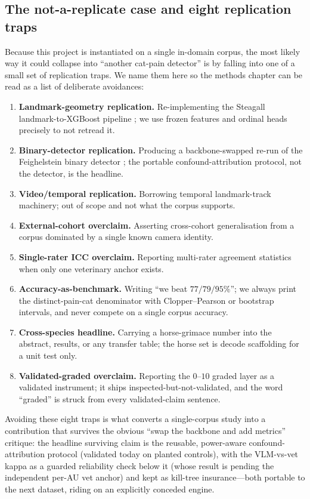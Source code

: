 \subsection{The not-a-replicate case and eight replication traps}
\label{subsec:bg-traps}

Because this project is instantiated on a single in-domain corpus, the most
likely way it could collapse into \enquote{another cat-pain detector} is by
falling into one of a small set of replication traps. We name them here so the
methods chapter can be read as a list of deliberate avoidances:

\begin{enumerate}
  \item \textbf{Landmark-geometry replication.} Re-implementing the Steagall
    landmark-to-XGBoost pipeline \cite{steagall2023}; we use frozen features and
    ordinal heads precisely to not retread it.
  \item \textbf{Binary-detector replication.} Producing a backbone-swapped
    re-run of the Feighelstein binary detector \cite{feighelstein2023}; the
    portable confound-attribution protocol, not the detector, is the headline.
  \item \textbf{Video/temporal replication.} Borrowing temporal landmark-track
    machinery; out of scope and not what the corpus supports.
  \item \textbf{External-cohort overclaim.} Asserting cross-cohort
    generalisation from a corpus dominated by a single known camera identity.
  \item \textbf{Single-rater ICC overclaim.} Reporting multi-rater agreement
    statistics when only one veterinary anchor exists.
  \item \textbf{Accuracy-as-benchmark.} Writing \enquote{we beat $77/79/95\%$};
    we always print the distinct-pain-cat denominator with Clopper--Pearson or
    bootstrap intervals, and never compete on a single corpus accuracy.
  \item \textbf{Cross-species headline.} Carrying a horse-grimace number into
    the abstract, results, or any transfer table; the horse set is decode
    scaffolding for a unit test only.
  \item \textbf{Validated-graded overclaim.} Reporting the $0$--$10$ graded
    layer as a validated instrument; it ships inspected-but-not-validated, and
    the word \enquote{graded} is struck from every validated-claim sentence.
\end{enumerate}

Avoiding these eight traps is what converts a single-corpus study into a
contribution that survives the obvious \enquote{swap the backbone and add
metrics} critique: the headline surviving claim is the reusable, power-aware
confound-attribution protocol (validated today on planted controls), with the
VLM-vs-vet kappa as a guarded reliability check below it (whose result is pending
the independent per-AU vet anchor) and kept as kill-tree insurance---both
portable to the next dataset, riding on an explicitly conceded engine.

